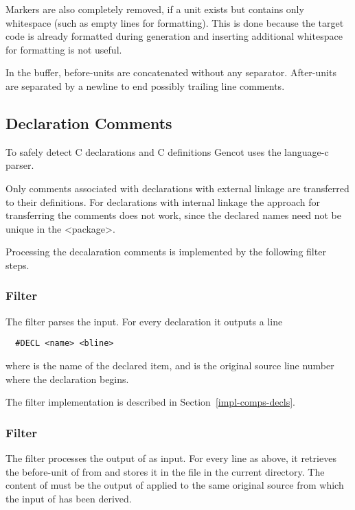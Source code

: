Markers are also completely removed, if a unit exists but contains only whitespace (such as empty lines for
formatting). This is done because the target code is already formatted during generation and inserting additional
whitespace for formatting is not useful.

In the buffer, before-units are concatenated without any separator. After-units are separated by a newline to end possibly 
trailing line comments.

\subsection{Declaration Comments}
\label{impl-comments-decl}

To safely detect C declarations and C definitions Gencot uses the language-c parser. 

Only comments associated with declarations with external linkage are transferred to their definitions. For declarations
with internal linkage the approach for transferring the comments does not work, since the declared names need not be
unique in the <package>.

Processing the decalaration comments is implemented by the following filter steps. 

\subsubsection{Filter }

The filter  parses the input. For every declaration it outputs a line
\begin{verbatim}
  #DECL <name> <bline>
\end{verbatim}
where  is the name of the declared item, and  is the original source line 
number where the declaration begins.

The filter implementation is described in Section~\ref{impl-comps-decls}.

\subsubsection{Filter }

The filter  processes the output of  as input. For every
line as above, it retrieves the before-unit of  from 
and stores it in the file  in the
current directory. The content of  must be the output of  applied to the same
original source from which the input of  has been derived.

